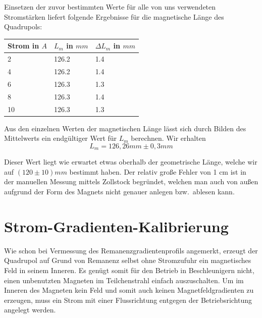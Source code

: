 \documentclass[bigchapter,colorback,accentcolor=tud4b,linedtoc,11pt]{tudreport}
\begin{document}
Einsetzen der zuvor bestimmten Werte für alle von uns verwendeten Stromstärken liefert folgende Ergebnisse für die magnetische Länge des Quadrupols:
\begin{center}
  \begin{tabular}{|p{2.6cm}|p{2.6cm}|p{2.6cm}|}
    \hline
    Strom in $A$ & $L_m$ in $mm$ & $\Delta L_m$ in $mm$ \\ \hline
    2            & 126.2         & 1.4                  \\ \hline
    4            & 126.2         & 1.4                  \\ \hline
    6            & 126.3         & 1.3                  \\ \hline
    8            & 126.3         & 1.4                  \\ \hline
    10           & 126.3         & 1.3                  \\ \hline
	\end{tabular}
\end{center}

Aus den einzelnen Werten der magnetischen Länge lässt sich durch Bilden des Mittelwerts ein endgültiger Wert für $L_m$ berechnen. Wir erhalten $$L_m=126,26mm\pm0,3mm$$

Dieser Wert liegt wie erwartet etwas oberhalb der geometrische Länge, welche wir auf $(120 \pm 10)mm$ bestimmt haben. Der relativ große Fehler von 1 cm ist in der manuellen Messung mittels Zollstock begründet, welchen man auch von außen aufgrund der Form des Magnets nicht genauer anlegen bzw.\ ablesen kann.

\section{Strom-Gradienten-Kalibrierung}
Wie schon bei Vermessung des Remanenzgradientenprofils angemerkt, erzeugt der Quadrupol auf Grund von Remanenz selbst ohne Stromzufuhr ein magnetisches Feld in seinem Inneren. Es genügt somit für den Betrieb in Beschleunigern nicht, einen unbenutzten Magneten im Teilchenstrahl einfach auszuschalten. Um im Inneren des Magneten kein Feld und somit auch keinen Magnetfeldgradienten zu erzeugen, muss ein Strom mit einer Flussrichtung entgegen der Betriebsrichtung angelegt werden.
\end{document}
